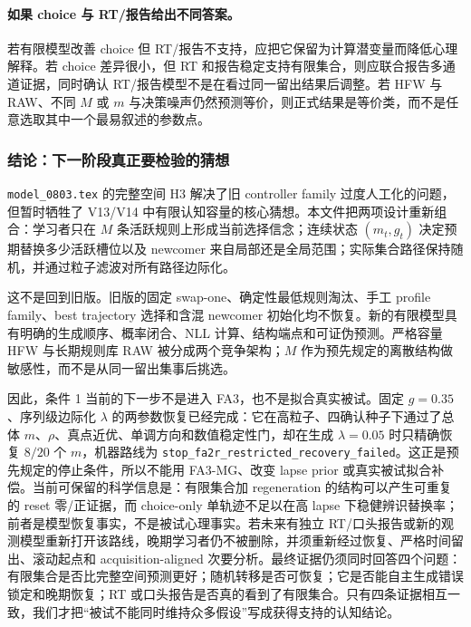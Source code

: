 \paragraph{如果 choice 与 RT/报告给出不同答案。}
若有限模型改善 choice 但 RT/报告不支持，应把它保留为计算潜变量而降低心理解释。若 choice 差异很小，但 RT 和报告稳定支持有限集合，则应联合报告多通道证据，同时确认 RT/报告模型不是在看过同一留出结果后调整。若 HFW 与 RAW、不同 $M$ 或 $m$ 与决策噪声仍然预测等价，则正式结果是等价类，而不是任意选取其中一个最易叙述的参数点。


\subsubsection{结论：下一阶段真正要检验的猜想}

\texttt{model\_0803.tex} 的完整空间 H3 解决了旧 controller family 过度人工化的问题，但暂时牺牲了 V13/V14 中有限认知容量的核心猜想。本文件把两项设计重新组合：学习者只在 $M$ 条活跃规则上形成当前选择信念；连续状态 $(m_t,g_t)$ 决定预期替换多少活跃槽位以及 newcomer 来自局部还是全局范围；实际集合路径保持随机，并通过粒子滤波对所有路径边际化。

这不是回到旧版。旧版的固定 swap-one、确定性最低规则淘汰、手工 profile family、best trajectory 选择和含混 newcomer 初始化均不恢复。新的有限模型具有明确的生成顺序、概率闭合、NLL 计算、结构端点和可证伪预测。严格容量 HFW 与长期规则库 RAW 被分成两个竞争架构；$M$ 作为预先规定的离散结构做敏感性，而不是从同一留出集事后挑选。

因此，条件 1 当前的下一步不是进入 FA3，也不是拟合真实被试。固定 $g=0.35$、序列级边际化 $\lambda$ 的两参数恢复已经完成：它在高粒子、四确认种子下通过了总体 $m$、$\rho$、真点近优、单调方向和数值稳定性门，却在生成 $\lambda=0.05$ 时只精确恢复 $8/20$ 个 $m$，机器路线为 \texttt{stop\_fa2r\_restricted\_recovery\_failed}。这正是预先规定的停止条件，所以不能用 FA3-MG、改变 lapse prior 或真实被试拟合补偿。当前可保留的科学信息是：有限集合加 regeneration 的结构可以产生可重复的 reset 零/正证据，而 choice-only 单轨迹不足以在高 lapse 下稳健辨识替换率；前者是模型恢复事实，不是被试心理事实。若未来有独立 RT/口头报告或新的观测模型重新打开该路线，晚期学习者仍不被删除，并须重新经过恢复、严格时间留出、滚动起点和 acquisition-aligned 次要分析。最终证据仍须同时回答四个问题：有限集合是否比完整空间预测更好；随机转移是否可恢复；它是否能自主生成错误锁定和晚期恢复；RT 或口头报告是否真的看到了有限集合。只有四条证据相互一致，我们才把“被试不能同时维持众多假设”写成获得支持的认知结论。
